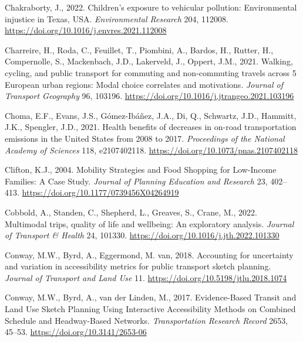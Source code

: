 \documentclass[
  letterpaper,
  DIV=11,
  numbers=noendperiod]{scrreport}
\newlength{\cslhangindent}
\newlength{\cslentryspacingunit} %
\newenvironment{CSLReferences}[2] %
 {%
  \setlength{\parindent}{0pt}
  \ifodd #1
  \let\oldpar\par
  \def\par{\hangindent=\cslhangindent\oldpar}
  \fi
  \setlength{\parskip}{#2\cslentryspacingunit}
 }%
 {}
\begin{document}
\begin{CSLReferences}{1}{0}
\leavevmode{}%
Chakraborty, J., 2022. Children's exposure to vehicular pollution:
{Environmental} injustice in {Texas}, {USA}. \emph{Environmental
Research} 204, 112008.
\url{https://doi.org/10.1016/j.envres.2021.112008}

\leavevmode{}%
Charreire, H., Roda, C., Feuillet, T., Piombini, A., Bardos, H., Rutter,
H., Compernolle, S., Mackenbach, J.D., Lakerveld, J., Oppert, J.M.,
2021. Walking, cycling, and public transport for commuting and
non-commuting travels across 5 {European} urban regions: {Modal} choice
correlates and motivations. \emph{Journal of Transport Geography} 96,
103196. \url{https://doi.org/10.1016/j.jtrangeo.2021.103196}

\leavevmode{}%
Choma, E.F., Evans, J.S., Gómez-Ibáñez, J.A., Di, Q., Schwartz, J.D.,
Hammitt, J.K., Spengler, J.D., 2021. Health benefits of decreases in
on-road transportation emissions in the {United States} from 2008 to
2017. \emph{Proceedings of the National Academy of Sciences} 118,
e2107402118. \url{https://doi.org/10.1073/pnas.2107402118}

\leavevmode{}%
Clifton, K.J., 2004. Mobility {Strategies} and {Food Shopping} for
{Low-Income Families}: {A Case Study}. \emph{Journal of Planning
Education and Research} 23, 402--413.
\url{https://doi.org/10.1177/0739456X04264919}

\leavevmode{}%
Cobbold, A., Standen, C., Shepherd, L., Greaves, S., Crane, M., 2022.
Multimodal trips, quality of life and wellbeing: {An} exploratory
analysis. \emph{Journal of Transport \& Health} 24, 101330.
\url{https://doi.org/10.1016/j.jth.2022.101330}

\leavevmode{}%
Conway, M.W., Byrd, A., Eggermond, M. van, 2018. Accounting for
uncertainty and variation in accessibility metrics for public transport
sketch planning. \emph{Journal of Transport and Land Use} 11.
\url{https://doi.org/10.5198/jtlu.2018.1074}

\leavevmode{}%
Conway, M.W., Byrd, A., van der Linden, M., 2017. Evidence-{Based
Transit} and {Land Use Sketch Planning Using Interactive Accessibility
Methods} on {Combined Schedule} and {Headway-Based Networks}.
\emph{Transportation Research Record} 2653, 45--53.
\url{https://doi.org/10.3141/2653-06}


\end{CSLReferences}
\end{document}
